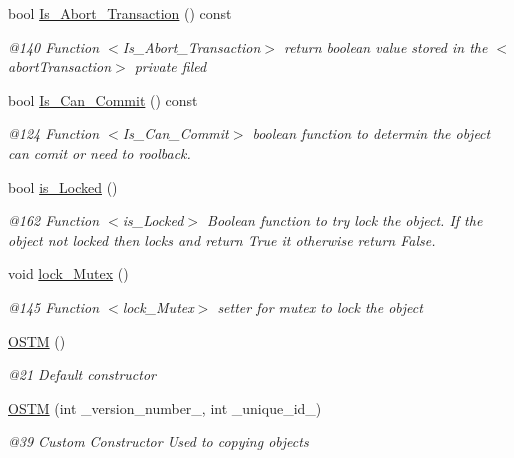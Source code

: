 \begin{DoxyCompactItemize}
bool \hyperlink{class_o_s_t_m_afc2851abf5342c3c67342c2c14820115_afc2851abf5342c3c67342c2c14820115}{Is\+\_\+\+Abort\+\_\+\+Transaction} () const 
\begin{DoxyCompactList}\small\item\em @140 Function $<$\+Is\+\_\+\+Abort\+\_\+\+Transaction$>$ return boolean value stored in the $<$abort\+Transaction$>$ private filed \end{DoxyCompactList}\item 
bool \hyperlink{class_o_s_t_m_a8df39ced3b401aa466df97e26d14b1b7_a8df39ced3b401aa466df97e26d14b1b7}{Is\+\_\+\+Can\+\_\+\+Commit} () const 
\begin{DoxyCompactList}\small\item\em @124 Function $<$\+Is\+\_\+\+Can\+\_\+\+Commit$>$ boolean function to determin the object can comit or need to roolback. \end{DoxyCompactList}\item 
bool \hyperlink{class_o_s_t_m_afb6520023ed2c4a6188b688c46f192d0_afb6520023ed2c4a6188b688c46f192d0}{is\+\_\+\+Locked} ()
\begin{DoxyCompactList}\small\item\em @162 Function $<$is\+\_\+\+Locked$>$ Boolean function to try lock the object. If the object not locked then locks and return True it otherwise return False. \end{DoxyCompactList}\item 
void \hyperlink{class_o_s_t_m_af192c598a3c647f37aaba5757e60240f_af192c598a3c647f37aaba5757e60240f}{lock\+\_\+\+Mutex} ()
\begin{DoxyCompactList}\small\item\em @145 Function $<$lock\+\_\+\+Mutex$>$ setter for mutex to lock the object \end{DoxyCompactList}\item 
\hyperlink{class_o_s_t_m_a968edf778668bd0ec7603f0571619196_a968edf778668bd0ec7603f0571619196}{O\+S\+TM} ()
\begin{DoxyCompactList}\small\item\em @21 Default constructor \end{DoxyCompactList}\item 
\hyperlink{class_o_s_t_m_a2314f55a127b94aa8a51d19ba798401e_a2314f55a127b94aa8a51d19ba798401e}{O\+S\+TM} (int \+\_\+version\+\_\+number\+\_\+, int \+\_\+unique\+\_\+id\+\_\+)
\begin{DoxyCompactList}\small\item\em @39 Custom Constructor Used to copying objects \end{DoxyCompactList}\item 

\end{DoxyCompactItemize}
